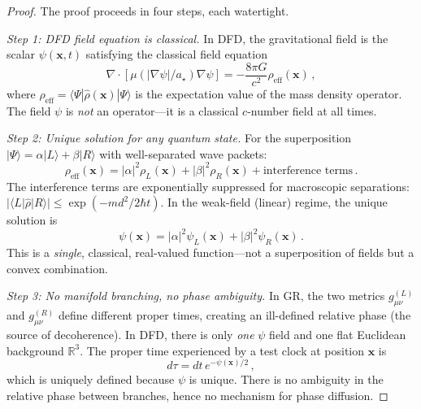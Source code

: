 \documentclass[aps,prl,twocolumn,superscriptaddress,nofootinbib,longbibliography]{revtex4-2}
\begin{document}
\begin{proof}
The proof proceeds in four steps, each watertight.

\emph{Step 1: DFD field equation is classical.}
In DFD, the gravitational field is the scalar $\psi(\mathbf{x},t)$
satisfying the classical field equation
\begin{equation}\label{eq:psi-classical}
\nabla\cdot[\mu(|\nabla\psi|/a_\star)\nabla\psi]
= -\frac{8\pi G}{c^2}\rho_{\text{eff}}(\mathbf{x})\,,
\end{equation}
where $\rho_{\text{eff}} = \langle\Psi|\hat{\rho}(\mathbf{x})|\Psi\rangle$
is the expectation value of the mass density operator. The field $\psi$
is \emph{not} an operator---it is a classical $c$-number field at all
times.

\emph{Step 2: Unique solution for any quantum state.}
For the superposition $|\Psi\rangle = \alpha|L\rangle + \beta|R\rangle$
with well-separated wave packets:
\begin{equation}
\rho_{\text{eff}}(\mathbf{x}) = |\alpha|^2\rho_L(\mathbf{x})
+ |\beta|^2\rho_R(\mathbf{x}) + \text{interference terms}\,.
\end{equation}
The interference terms are exponentially suppressed for macroscopic
separations: $|\langle L|\hat{\rho}|R\rangle| \leq \exp(-m d^2/2\hbar t)$.
In the weak-field (linear) regime, the unique solution is
\begin{equation}\label{eq:psi-unique}
\psi(\mathbf{x}) = |\alpha|^2\psi_L(\mathbf{x})
+ |\beta|^2\psi_R(\mathbf{x})\,.
\end{equation}
This is a \emph{single}, classical, real-valued function---not a
superposition of fields but a convex combination.

\emph{Step 3: No manifold branching, no phase ambiguity.}
In GR, the two metrics $g_{\mu\nu}^{(L)}$ and $g_{\mu\nu}^{(R)}$ define
different proper times, creating an ill-defined relative phase (the
source of decoherence). In DFD, there is only \emph{one} $\psi$ field
and one flat Euclidean background $\mathbb{R}^3$. The proper time
experienced by a test clock at position $\mathbf{x}$ is
\begin{equation}
d\tau = dt\,e^{-\psi(\mathbf{x})/2}\,,
\end{equation}
which is uniquely defined because $\psi$ is unique. There is no
ambiguity in the relative phase between branches, hence no mechanism
for phase diffusion.


\end{proof}
\end{document}
